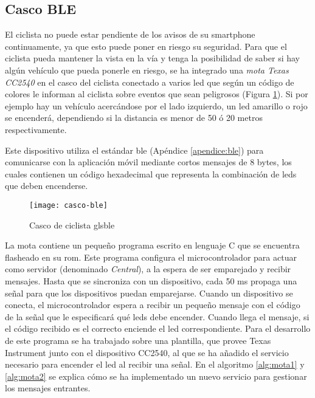 \FloatBarrier
\subsection{Casco BLE}\label{ssection:cascoBLE}
El ciclista no puede estar pendiente de los avisos de su smartphone
continuamente, ya que esto puede poner en riesgo su seguridad. Para que el
ciclista pueda mantener la vista en la vía y tenga la posibilidad de saber si
hay algún vehículo que pueda ponerle en riesgo, se ha integrado una \emph{mota
Texas CC2540} en el casco del ciclista conectado a varios led que según un
código de colores le informan al ciclista sobre eventos que sean peligrosos
(Figura \ref{fig:casco-ble}). Si por ejemplo hay un vehículo acercándose por el
lado izquierdo, un led amarillo o rojo se encenderá, dependiendo si la
distancia es menor de 50 ó 20 metros respectivamente.

Este dispositivo utiliza el estándar \gls{ble} (Apéndice \ref{apendice:ble})
para comunicarse con la aplicación móvil mediante cortos mensajes de 8 bytes,
los cuales contienen un código hexadecimal que representa la combinación de
leds que deben encenderse.

\begin{figure}[h]
	\begin{center}
		\texttt{[image: casco-ble]}
		\caption{Casco de ciclista gls{ble}}
		\label{fig:casco-ble}
	\end{center}
\end{figure}

La mota contiene un pequeño programa escrito en	lenguaje C que se encuentra
flasheado en su \gls{rom}. Este programa configura el microcontrolador para
actuar como servidor (denominado \emph{Central}), a la espera de ser
emparejado y recibir mensajes. Hasta que se sincroniza con un dispositivo,
cada 50 ms propaga una señal para que los dispositivos puedan emparejarse.
Cuando un dispositivo se conecta, el microcontrolador espera a recibir un
pequeño mensaje con el código de la señal que le especificará qué	leds debe
encender. Cuando llega el mensaje, si el código recibido es el correcto
enciende el led correspondiente. Para el desarrollo de este programa se ha
trabajado sobre una plantilla, que provee Texas Instrument junto con el
dispositivo CC2540,	al que se ha añadido el servicio necesario para encender
el led al recibir una señal. En el algoritmo \ref{alg:mota1} y \ref{alg:mota2}
se explica cómo se ha implementado un nuevo servicio para gestionar los
mensajes entrantes.

